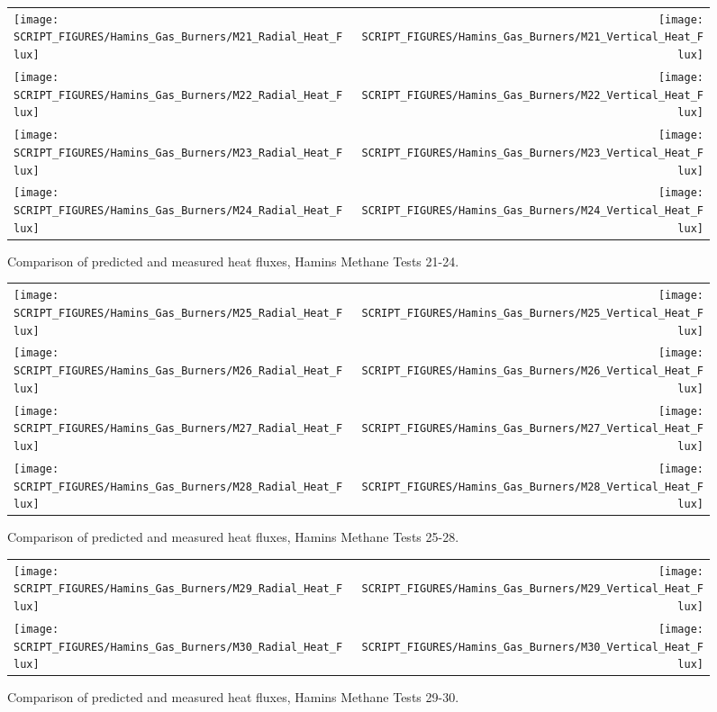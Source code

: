 \begin{figure}[p]
\begin{tabular*}{\textwidth}{l@{\extracolsep{\fill}}r}
\texttt{[image: SCRIPT\_FIGURES/Hamins\_Gas\_Burners/M21\_Radial\_Heat\_Flux]} &
\texttt{[image: SCRIPT\_FIGURES/Hamins\_Gas\_Burners/M21\_Vertical\_Heat\_Flux]} \\
\texttt{[image: SCRIPT\_FIGURES/Hamins\_Gas\_Burners/M22\_Radial\_Heat\_Flux]} &
\texttt{[image: SCRIPT\_FIGURES/Hamins\_Gas\_Burners/M22\_Vertical\_Heat\_Flux]} \\
\texttt{[image: SCRIPT\_FIGURES/Hamins\_Gas\_Burners/M23\_Radial\_Heat\_Flux]} &
\texttt{[image: SCRIPT\_FIGURES/Hamins\_Gas\_Burners/M23\_Vertical\_Heat\_Flux]} \\
\texttt{[image: SCRIPT\_FIGURES/Hamins\_Gas\_Burners/M24\_Radial\_Heat\_Flux]} &
\texttt{[image: SCRIPT\_FIGURES/Hamins\_Gas\_Burners/M24\_Vertical\_Heat\_Flux]}
\end{tabular*}
\label{Hamins_Methane_21-24}
\caption[Heat flux predictions, Hamins methane burner Tests 21-24]
{Comparison of predicted and measured heat fluxes, Hamins Methane Tests 21-24.}
\end{figure}

\begin{figure}[p]
\begin{tabular*}{\textwidth}{l@{\extracolsep{\fill}}r}
\texttt{[image: SCRIPT\_FIGURES/Hamins\_Gas\_Burners/M25\_Radial\_Heat\_Flux]} &
\texttt{[image: SCRIPT\_FIGURES/Hamins\_Gas\_Burners/M25\_Vertical\_Heat\_Flux]} \\
\texttt{[image: SCRIPT\_FIGURES/Hamins\_Gas\_Burners/M26\_Radial\_Heat\_Flux]} &
\texttt{[image: SCRIPT\_FIGURES/Hamins\_Gas\_Burners/M26\_Vertical\_Heat\_Flux]} \\
\texttt{[image: SCRIPT\_FIGURES/Hamins\_Gas\_Burners/M27\_Radial\_Heat\_Flux]} &
\texttt{[image: SCRIPT\_FIGURES/Hamins\_Gas\_Burners/M27\_Vertical\_Heat\_Flux]} \\
\texttt{[image: SCRIPT\_FIGURES/Hamins\_Gas\_Burners/M28\_Radial\_Heat\_Flux]} &
\texttt{[image: SCRIPT\_FIGURES/Hamins\_Gas\_Burners/M28\_Vertical\_Heat\_Flux]}
\end{tabular*}
\label{Hamins_Methane_25-28}
\caption[Heat flux predictions, Hamins methane burner Tests 25-28]
{Comparison of predicted and measured heat fluxes, Hamins Methane Tests 25-28.}
\end{figure}

\begin{figure}[p]
\begin{tabular*}{\textwidth}{l@{\extracolsep{\fill}}r}
\texttt{[image: SCRIPT\_FIGURES/Hamins\_Gas\_Burners/M29\_Radial\_Heat\_Flux]} &
\texttt{[image: SCRIPT\_FIGURES/Hamins\_Gas\_Burners/M29\_Vertical\_Heat\_Flux]} \\
\texttt{[image: SCRIPT\_FIGURES/Hamins\_Gas\_Burners/M30\_Radial\_Heat\_Flux]} &
\texttt{[image: SCRIPT\_FIGURES/Hamins\_Gas\_Burners/M30\_Vertical\_Heat\_Flux]}
\end{tabular*}
\label{Hamins_Methane_29-30}
\caption[Heat flux predictions, Hamins methane burner Tests 29-30]
{Comparison of predicted and measured heat fluxes, Hamins Methane Tests 29-30.}
\end{figure}

